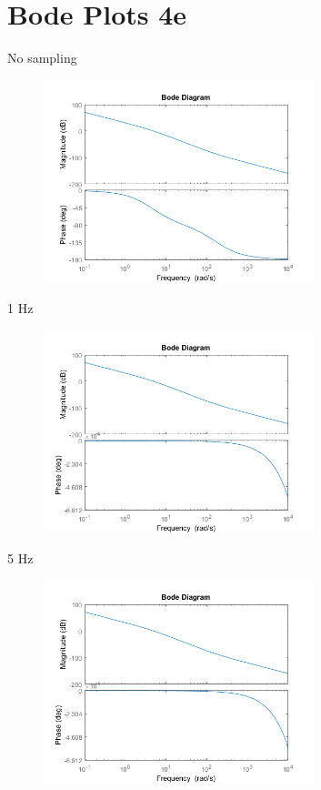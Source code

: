 \documentclass{article}
\begin{document}
\section{Bode Plots 4e}
No sampling
\begin{figure}[H]
    \centering
    \includegraphics[width=0.7\textwidth]{P4e1.png}
\end{figure}
1 Hz
\begin{figure}[H]
    \centering
    \includegraphics[width=0.7\textwidth]{P4e1hz.png}
\end{figure}
5 Hz
\begin{figure}[H]
    \centering
    \includegraphics[width=0.7\textwidth]{P4e5hz.png}
\end{figure}
\end{document}
